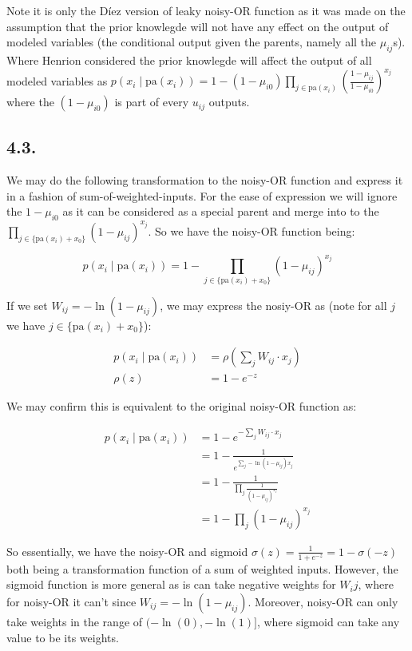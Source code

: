 \documentclass[11pt]{article}
\begin{document}
Note it is only the D\'{i}ez version of leaky noisy-OR function as it was made on the assumption that the prior knowlegde will not have any effect on the output of modeled variables (the conditional output given the parents, namely all the $\mu_{ij}$s). Where Henrion considered the prior knowlegde will affect the output of all modeled variables as $p(x_i \mid \textrm{pa}({x_i})) = 1 - (1 - \mu_{i0}) \prod_{j \in \textrm{pa}(x_i)}(\frac{1 - \mu_{ij}}{1 - \mu_{i0}})^{x_j}$ where the $(1 - \mu_{i0})$ is part of every $u_{ij}$ outputs.

\subsection*{4.3.}

We may do the following transformation to the noisy-OR function and express it in a fashion of sum-of-weighted-inputs. For the ease of expression we will ignore the $1 - \mu_{i0}$ as it can be considered as a special parent and merge into to the $\prod_{j \in \{ \textrm{pa}(x_i) + x_0 \}}(1 - \mu_{ij})^{x_j}$. So we have the noisy-OR function being:

\begin{equation*}
    p(x_i \mid \textrm{pa}({x_i})) = 1 - \prod_{j \in \{ \textrm{pa}(x_i) + x_0 \}} (1 - \mu_{ij})^{x_j}
\end{equation*}

If we set $W_{ij} = - \ln(1 - \mu_{ij})$, we may express the nosiy-OR as (note for all $j$ we have $j \in \{ \textrm{pa}(x_i) + x_0 \}$):

\begin{align*}
    p(x_i \mid \textrm{pa}({x_i})) &= \rho (\sum_j W_{ij} \cdot x_{j}) \\
    \rho(z) &= 1 - e^{-z}
\end{align*}

We may confirm this is equivalent to the original noisy-OR function as:

\begin{align*}
    p(x_i \mid \textrm{pa}({x_i})) &= 1 - e^{-\sum_j W_{ij} \cdot x_{j}} \\
    &=1 - \frac{1}{e^{\sum_j -\ln(1 - \mu_{ij}) x_j}} \\
    &= 1 - \frac{1}{\prod_j \frac{1}{(1 - \mu_{ij}) ^ {x_j}}} \\
    &= 1 - \prod_j (1 - \mu_{ij})^{x_j}
\end{align*}

So essentially, we have the noisy-OR and sigmoid $\sigma(z) = \frac{1}{1 + e^{-z}} = 1 - \sigma(-z)$ both being a transformation function of a sum of weighted inputs. However, the sigmoid function is more general as is can take negative weights for $W_ij$, where for noisy-OR it can't since $W_{ij} = - \ln(1 - \mu_{ij})$. Moreover, noisy-OR can only take weights in the range of $(-\ln(0), -\ln(1)]$, where sigmoid can take any value to be its weights.
\end{document}
